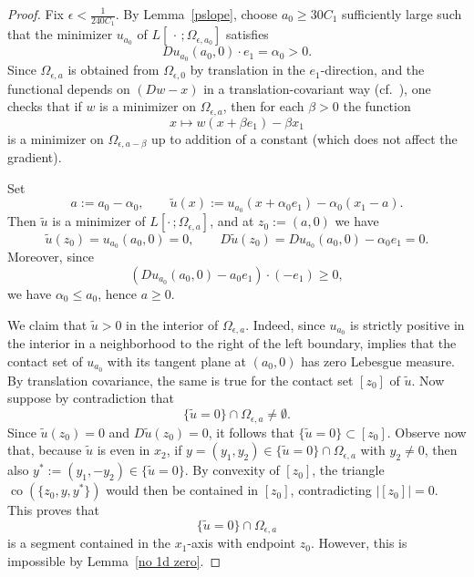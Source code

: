 \documentclass[reqno,11pt]{amsart}
\numberwithin{equation}{section}
\theoremstyle{remark}
\begin{document}
\begin{proof}
Fix $\epsilon<\frac{1}{240C_1}$.
By Lemma~\ref{pslope}, choose $a_0\ge 30C_1$ sufficiently large such that the minimizer $u_{a_0}$ of
$L[\,\cdot\,;\Omega_{\epsilon,a_0}]$ satisfies
\[
Du_{a_0}(a_0,0)\cdot e_1=\alpha_0>0.
\]
Since $\Omega_{\epsilon,a}$ is obtained from $\Omega_{\epsilon,0}$ by translation in the $e_1$-direction, and the functional
depends on $(Dw-x)$ in a translation-covariant way (cf.\ \cite{MRZ20252}), one checks that if $w$ is a minimizer on
$\Omega_{\epsilon,a}$, then for each $\beta>0$ the function
\[
x\mapsto w(x+\beta e_1)-\beta x_1
\]
is a minimizer on $\Omega_{\epsilon,a-\beta}$ up to addition of a constant (which does not affect the gradient).



Set
\[
a:=a_0-\alpha_0,
\qquad
\tilde u(x):=u_{a_0}(x+\alpha_0 e_1)-\alpha_0(x_1-a).
\]
Then \(\tilde u\) is a minimizer of \(L[\cdot\,;\Omega_{\epsilon,a}]\), and at
$z_0:=(a,0)$
we have
\[
\tilde u(z_0)=u_{a_0}(a_0,0)=0,
\qquad
D\tilde u(z_0)=Du_{a_0}(a_0,0)-\alpha_0 e_1=0.
\]
Moreover, since
\[
(Du_{a_0}(a_0,0)-a_0e_1)\cdot(-e_1)\ge0,
\]
we have \(\alpha_0\le a_0\), hence \(a\ge0\).

We claim that \(\tilde u>0\) in the interior of \(\Omega_{\epsilon,a}\).
Indeed, since \(u_{a_0}\) is strictly positive in the interior in a neighborhood to the right of the left boundary, \cite[Theorem~1(i)]{MRZ20252} implies that the contact set of \(u_{a_0}\) with its tangent plane at \((a_0,0)\) has zero Lebesgue measure. By translation covariance, the same is true for the contact set \([z_0]\) of \(\tilde u\). 
Now suppose by contradiction that
\[
\{\tilde u=0\}\cap \Omega_{\epsilon,a}\neq\emptyset.
\]
Since \(\tilde u(z_0)=0\) and \(D\tilde u(z_0)=0\), it follows that
$\{\tilde u=0\}\subset [z_0].$
Observe now that, because \(\tilde u\) is even in \(x_2\), if \(y=(y_1,y_2)\in \{\tilde u=0\}\cap\Omega_{\epsilon,a}\) with \(y_2\neq0\), then also
$y^*:=(y_1,-y_2)\in \{\tilde u=0\}.$
By convexity of \([z_0]\), the triangle \(\operatorname{co}(\{z_0,y,y^*\})\) would then be contained in \([z_0]\), contradicting \(|[z_0]|=0\).
This proves that 
\[
\{\tilde u=0\}\cap \Omega_{\epsilon,a}
\]
is a segment contained in the \(x_1\)-axis with endpoint \(z_0\).
However, this is impossible by Lemma~\ref{no 1d zero}. 



\end{proof}
\end{document}
